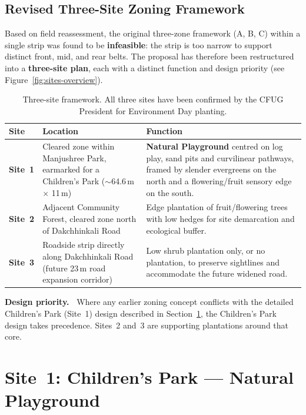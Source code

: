 \documentclass[11pt,a4paper]{article}
\newenvironment{notebox}[1][Note]{%
  \par\medskip\noindent\textbf{#1.~}\ignorespaces}{\par\medskip}
\begin{document}
\subsection{Revised Three-Site Zoning Framework}
Based on field reassessment, the original three-zone framework (A, B, C) within a single strip was found to be \textbf{infeasible}: the strip is too narrow to support distinct front, mid, and rear belts. The proposal has therefore been restructured into a \textbf{three-site plan}, each with a distinct function and design priority (see Figure~\ref{fig:sites-overview}).

\begin{table}[H]
\centering
\small
\begin{tabularx}{\linewidth}{L{2.0cm} L{4.4cm} X}
\toprule
\textbf{Site} & \textbf{Location} & \textbf{Function} \\
\midrule
\textbf{Site~1} & Cleared zone within Manjushree Park, earmarked for a Children's Park ($\sim$64.6\,m $\times$ 11\,m) & \textbf{Natural Playground} centred on log play, sand pits and curvilinear pathways, framed by slender evergreens on the north and a flowering/fruit sensory edge on the south. \\
\textbf{Site~2} & Adjacent Community Forest, cleared zone north of Dakchhinkali Road & Edge plantation of fruit/flowering trees with low hedges for site demarcation and ecological buffer. \\
\textbf{Site~3} & Roadside strip directly along Dakchhinkali Road (future 23\,m road expansion corridor) & Low shrub plantation only, or no plantation, to preserve sightlines and accommodate the future widened road. \\
\bottomrule
\end{tabularx}
\caption{Three-site framework. All three sites have been confirmed by the CFUG President for Environment Day planting.}
\end{table}

\begin{notebox}[Design priority]
Where any earlier zoning concept conflicts with the detailed Children's Park (Site~1) design described in Section~\ref{sec:site1}, the Children's Park design takes precedence. Sites~2 and~3 are supporting plantations around that core.
\end{notebox}

\section{Site~1: Children's Park --- Natural Playground}
\label{sec:site1}
\end{document}
